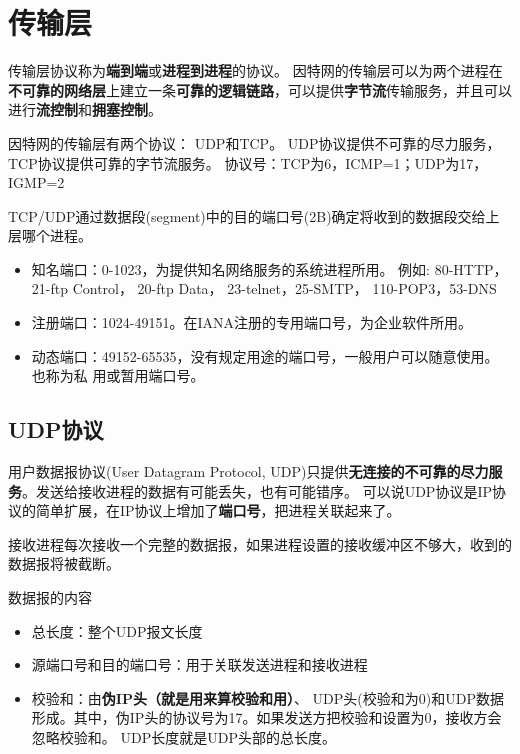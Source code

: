 
\section{传输层} %
传输层协议称为\textbf{端到端}或\textbf{进程到进程}的协议。 因特网的传输层可以为两个进程在\textbf{不可靠的网络层}上建立一条\textbf{可靠的逻辑链路}，可以提供\textbf{字节流}传输服务，并且可以进行\textbf{流控制}和\textbf{拥塞控制}。

因特网的传输层有两个协议： UDP和TCP。
UDP协议提供不可靠的尽力服务， TCP协议提供可靠的字节流服务。
协议号：TCP为6，ICMP=1；UDP为17，IGMP=2

TCP/UDP通过数据段(segment)中的目的端口号(2B)确定将收到的数据段交给上层哪个进程。
\begin{itemize}
    \item 知名端口：0-1023，为提供知名网络服务的系统进程所用。    例如: 80-HTTP， 21-ftp Control， 20-ftp Data， 23-telnet，25-SMTP， 110-POP3，53-DNS
    \item 注册端口：1024-49151。在IANA注册的专用端口号，为企业软件所用。
    \item 动态端口：49152-65535，没有规定用途的端口号，一般用户可以随意使用。也称为私    用或暂用端口号。
\end{itemize}

\subsection{UDP协议}
用户数据报协议(User Datagram Protocol, UDP)只提供\textbf{无连接的不可靠的尽力服务}。发送给接收进程的数据有可能丢失，也有可能错序。
可以说UDP协议是IP协议的简单扩展，在IP协议上增加了\textbf{端口号}，把进程关联起来了。

接收进程每次接收一个完整的数据报，如果进程设置的接收缓冲区不够大，收到的数据报将被截断。

数据报的内容
\begin{itemize}
    \item 总长度：整个UDP报文长度
    \item 源端口号和目的端口号：用于关联发送进程和接收进程
    \item 校验和：由\textbf{伪IP头（就是用来算校验和用）}、 UDP头(校验和为0)和UDP数据形成。其中，伪IP头的协议号为17。如果发送方把校验和设置为0，接收方会忽略校验和。 UDP长度就是UDP头部的总长度。
\end{itemize}


